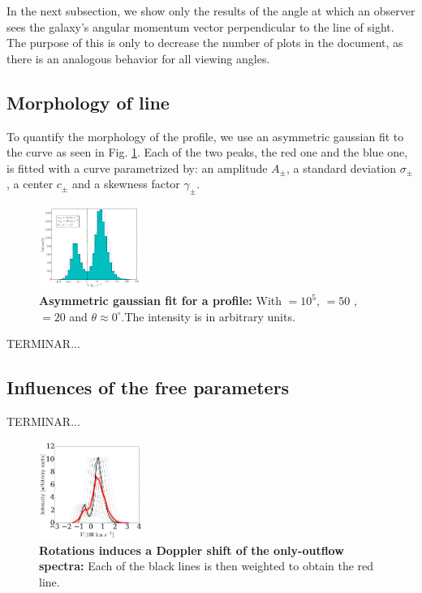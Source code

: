 \documentclass[twocolappendix]{latex/emulateapj}
\begin{document}
In the next subsection, we show only the results of the angle at which an observer sees the galaxy's angular momentum vector perpendicular to the line of sight. The purpose of this is only to decrease the number of plots in the document, as there is an analogous behavior for all viewing angles. \\

\subsection{Morphology of \lya line}
To quantify the morphology of the \lya profile, we use an asymmetric gaussian fit to the curve as seen in Fig. \ref{fig:asymmetric_gaussian_fit}. Each of the two peaks, the red one and the blue one, is fitted with a curve parametrized by: an amplitude $A_{\pm}$, a standard deviation $\sigma_{\pm}$, a center $c_{\pm}$ and a skewness factor $\gamma_{\pm}$.\\

\begin{figure}[h!]
	\begin{center}
		\includegraphics[width=0.3\textwidth]{./figures/asymmetric_gaussian_fit}
	\end{center}
	\caption{\textbf{Asymmetric gaussian fit for a \lya profile:} With \tauh$=10^5$, \vrot$=50$ \kms, \vout$=20$ \kms and $\theta \approx 0^\circ$.The intensity is in arbitrary units.
		\label{fig:asymmetric_gaussian_fit}}
\end{figure}

TERMINAR...\\


\subsection{Influences of the free parameters}

TERMINAR...\\

\begin{figure}[h!]
	\begin{center}
		\includegraphics[width=0.3\textwidth]{./figures/rotation_doppler_outflow}
	\end{center}
	\caption{\textbf{Rotations induces a Doppler shift of the only-outflow spectra:} Each of the black lines is then weighted to obtain the red line.
		\label{fig:rotation_doppler_outflow}}
\end{figure}
\end{document}
